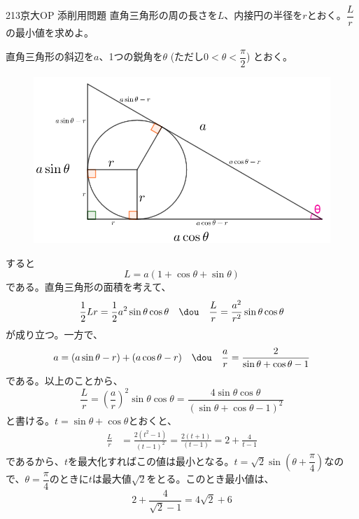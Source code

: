 \begin{thm}{213}{}{京大OP 添削用問題}
 直角三角形の周の長さを$L$、内接円の半径を$r$とおく。$\dfrac{L}{r}$の最小値を求めよ。
\end{thm}

直角三角形の斜辺を$a$、1つの鋭角を$\theta$ (ただし$0<\theta<\dfrac{\pi}{2}$) とおく。
\begin{figure}[H]
 \centering
 \includegraphics[width=0.6\linewidth]{../problems/Q_213/A_213.png}
\end{figure}
すると
\[ L=a(1+\cos\theta+\sin\theta) \]
である。直角三角形の面積を考えて、
\[ \frac{1}{2}Lr=\frac{1}{2}a^2\sin\theta\cos\theta \quad\dou\quad \frac{L}{r}=\frac{a^2}{r^2}\sin\theta\cos\theta \]
が成り立つ。一方で、
\[ a=(a\sin\theta-r)+(a\cos\theta-r) \quad\dou\quad \frac{a}{r}=\frac{2}{\sin\theta+\cos\theta-1} \]
である。以上のことから、
\[ \frac{L}{r}=\left(\frac{a}{r}\right)^2\sin\theta\cos\theta=\frac{4\sin\theta\cos\theta}{(\sin\theta+\cos\theta-1)^2} \]
と書ける。$t=\sin\theta+\cos\theta$とおくと、
\begin{align*}
 \frac{L}{r}&=\frac{2(t^2-1)}{(t-1)^2}=\frac{2(t+1)}{(t-1)}=2+\frac{4}{t-1}
\end{align*}
であるから、$t$を最大化すればこの値は最小となる。$t=\sqrt{2}\sin\left(\theta+\dfrac{\pi}{4}\right)$なので、$\theta=\dfrac{\pi}{4}$のときに$t$は最大値$\sqrt{2}$をとる。このとき最小値は、
\[ 2+\frac{4}{\sqrt{2}-1}=4\sqrt{2}+6 \]